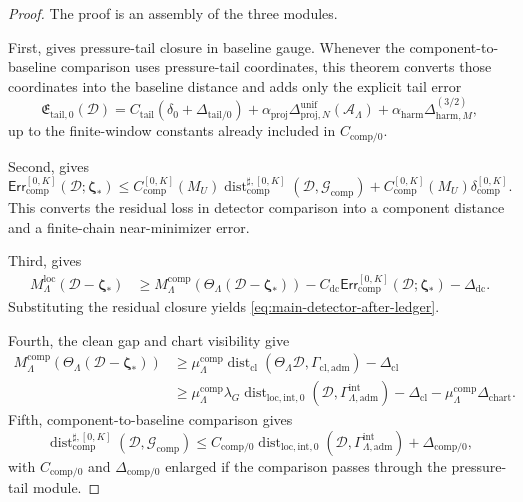\documentclass[11pt]{article}
\numberwithin{equation}{section}
\theoremstyle{definition}
\theoremstyle{remark}
\newcommand{\loc}{\mathrm{loc}}
\newcommand{\intg}{\mathrm{int}}
\newcommand{\tail}{\mathrm{tail}}
\newcommand{\adm}{\mathrm{adm}}
\newcommand{\proj}{\mathrm{proj}}
\newcommand{\harm}{\mathrm{harm}}
\newcommand{\cl}{\mathrm{cl}}
\newcommand{\comp}{\mathrm{comp}}
\newcommand{\Err}{\mathsf{Err}}
\newcommand{\Dist}{\operatorname{dist}}
\newcommand{\calA}{\mathcal A}
\newcommand{\calD}{\mathcal D}
\newcommand{\calG}{\mathcal G}
\newcommand{\bzeta}{\boldsymbol\zeta}
\begin{document}
\begin{proof}
The proof is an assembly of the three modules.

First,  gives pressure-tail closure in baseline gauge.  Whenever the component-to-baseline comparison uses pressure-tail coordinates, this theorem converts those coordinates into the baseline distance and adds only the explicit tail error
\[
        \mathfrak E_{\tail,0}(\calD)
        =
        C_{\tail}(\delta_0+\Delta_{\tail/0})
        +
        \alpha_{\proj}\Delta^{\mathrm{unif}}_{\proj,N}(\calA_\Lambda)
        +
        \alpha_{\harm}\Delta^{(3/2)}_{\harm,M},
\]
up to the finite-window constants already included in \(C_{\comp/0}\).

Second,  gives
\[
        \Err_{\comp}^{[0,K]}(\calD;\bzeta_*)
        \le
        C_{\comp}^{[0,K]}(M_U)
        \Dist_{\comp}^{\sharp,[0,K]}(\calD,\calG_{\comp})
        +
        C_{\comp}^{[0,K]}(M_U)
        \delta_{\comp}^{[0,K]}.
\]
This converts the residual loss in detector comparison into a component distance and a finite-chain near-minimizer error.

Third,  gives
\[
\begin{aligned}
        M_{\Lambda}^{\loc}(\calD-\bzeta_*)
        &\ge
        M_{\Lambda}^{\comp}(\Theta_\Lambda(\calD-\bzeta_*))
        -C_{\mathrm{dc}}
        \Err_{\comp}^{[0,K]}(\calD;\bzeta_*)
        -\Delta_{\mathrm{dc}}.
\end{aligned}
\]
Substituting the residual closure yields \eqref{eq:main-detector-after-ledger}.

Fourth, the clean gap and chart visibility give
\[
\begin{aligned}
        M_{\Lambda}^{\comp}(\Theta_\Lambda(\calD-\bzeta_*))
        &\ge
        \mu_\Lambda^{\comp}
        \Dist_{\cl}(\Theta_\Lambda\calD,\Gamma_{\cl,\adm})
        -\Delta_{\cl}\\
        &\ge
        \mu_\Lambda^{\comp}\lambda_G
        \Dist_{\loc,\intg,0}(\calD,\Gamma^{\intg}_{\Lambda,\adm})
        -\Delta_{\cl}
        -\mu_\Lambda^{\comp}\Delta_{\mathrm{chart}}.
\end{aligned}
\]
Fifth, component-to-baseline comparison gives
\[
        \Dist_{\comp}^{\sharp,[0,K]}(\calD,\calG_{\comp})
        \le
        C_{\comp/0}
        \Dist_{\loc,\intg,0}(\calD,\Gamma^{\intg}_{\Lambda,\adm})
        +\Delta_{\comp/0},
\]
with \(C_{\comp/0}\) and \(\Delta_{\comp/0}\) enlarged if the comparison passes through the pressure-tail module.


\end{proof}
\end{document}
